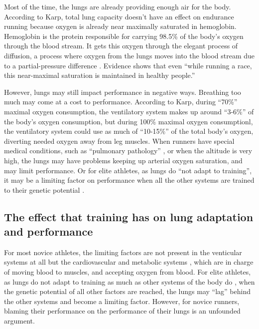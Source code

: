 \documentclass[index]{subfiles}
\begin{document}
Most of the time, the lungs are already providing enough air for the body. According to Karp, total lung capacity doesn't have an effect on endurance running because oxygen is already near maximally saturated in hemoglobin. Hemoglobin is the protein responsible for carrying 98.5\% of the body's oxygen through the blood stream. It gets this oxygen through the elegant process of diffusion, a process where oxygen from the lungs moves into the blood stream due to a partial-pressure difference \citep{karp}. Evidence shows that even ``while running a race, this near-maximal saturation is maintained in healthy people.''

However, lungs may still impact performance in negative ways. Breathing too much may come at a cost to performance. According to Karp, during ``70\%'' maximal oxygen consumption, the ventilatory system makes up around ``3-6\%'' of the body's oxygen consumption, but during 100\% maximal oxygen consumptionl, the ventilatory system could use as much of ``10-15\%'' of the total body's oxygen, diverting needed oxygen away from leg muscles. When runners have special medical conditions, such as ``pulmonary pathology'' \citep{karp}, or when the altitude is very high, the lungs may have problems keeping up arterial oxygen saturation, and may limit performance. Or for elite athletes, as lungs do ``not adapt to training'', it may be a limiting factor on performance when all the other systems are trained to their genetic potential \citep{karp}.

\subsection{The effect that training has on lung adaptation and performance}

For most novice athletes, the limiting factors are not present in the venticular systems at all but the cardiovascular and metabolic systems \citep{karp}, which are in charge of moving blood to muscles, and accepting oxygen from blood. For elite athletes, as lungs do not adapt to training as much as other systems of the body do \citep{karp}, when the genetic potential of all other factors are reached, the lungs may ``lag'' behind the other systems and become a limiting factor. However, for novice runners, blaming their performance on the performance of their lungs is an unfounded argument.



\end{document}
